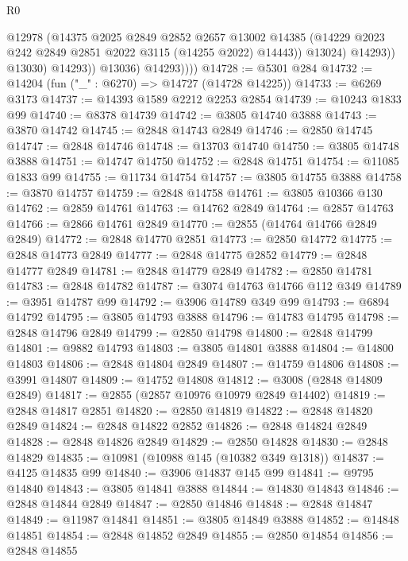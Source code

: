 \begin{lexlean}{R0}
\begin{coremodule}
                          @12978
                          (@14375
                            @2025
                            @2849
                            @2852
                            @2657
                            @13002
                            @14385
                            (@14229 @2023 @242 @2849 @2851 @2022 @3115 (@14255 @2022) @14443))
                          @13024)
                        @14293))
                    @13030)
                  @14293))
              @13036)
            @14293))))
@14728 := @5301 @284
@14732 := @14204 (fun ("_" : @6270) => @14727 (@14728 @14225))
@14733 := @6269 @3173
@14737 := @14393 @1589 @2212 @2253 @2854
@14739 := @10243 @1833 @99
@14740 := @8378 @14739
@14742 := @3805 @14740 @3888
@14743 := @3870 @14742
@14745 := @2848 @14743 @2849
@14746 := @2850 @14745
@14747 := @2848 @14746
@14748 := @13703 @14740
@14750 := @3805 @14748 @3888
@14751 := @14747 @14750
@14752 := @2848 @14751
@14754 := @11085 @1833 @99
@14755 := @11734 @14754
@14757 := @3805 @14755 @3888
@14758 := @3870 @14757
@14759 := @2848 @14758
@14761 := @3805 @10366 @130
@14762 := @2859 @14761
@14763 := @14762 @2849
@14764 := @2857 @14763
@14766 := @2866 @14761 @2849
@14770 := @2855 (@14764 @14766 @2849 @2849)
@14772 := @2848 @14770 @2851
@14773 := @2850 @14772
@14775 := @2848 @14773 @2849
@14777 := @2848 @14775 @2852
@14779 := @2848 @14777 @2849
@14781 := @2848 @14779 @2849
@14782 := @2850 @14781
@14783 := @2848 @14782
@14787 := @3074 @14763 @14766 @112 @349
@14789 := @3951 @14787 @99
@14792 := @3906 @14789 @349 @99
@14793 := @6894 @14792
@14795 := @3805 @14793 @3888
@14796 := @14783 @14795
@14798 := @2848 @14796 @2849
@14799 := @2850 @14798
@14800 := @2848 @14799
@14801 := @9882 @14793
@14803 := @3805 @14801 @3888
@14804 := @14800 @14803
@14806 := @2848 @14804 @2849
@14807 := @14759 @14806
@14808 := @3991 @14807
@14809 := @14752 @14808
@14812 := @3008 (@2848 @14809 @2849)
@14817 := @2855 (@2857 @10976 @10979 @2849 @14402)
@14819 := @2848 @14817 @2851
@14820 := @2850 @14819
@14822 := @2848 @14820 @2849
@14824 := @2848 @14822 @2852
@14826 := @2848 @14824 @2849
@14828 := @2848 @14826 @2849
@14829 := @2850 @14828
@14830 := @2848 @14829
@14835 := @10981 (@10988 @145 (@10382 @349 @1318))
@14837 := @4125 @14835 @99
@14840 := @3906 @14837 @145 @99
@14841 := @9795 @14840
@14843 := @3805 @14841 @3888
@14844 := @14830 @14843
@14846 := @2848 @14844 @2849
@14847 := @2850 @14846
@14848 := @2848 @14847
@14849 := @11987 @14841
@14851 := @3805 @14849 @3888
@14852 := @14848 @14851
@14854 := @2848 @14852 @2849
@14855 := @2850 @14854
@14856 := @2848 @14855

\end{coremodule}
\end{lexlean}
